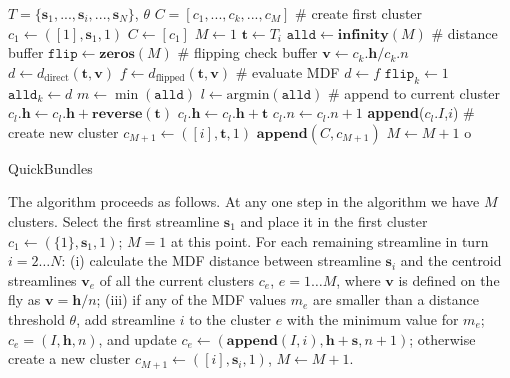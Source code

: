 \documentclass{bioinfo}
\begin{document}
\begin{methods}
\begin{algorithm}[h]
\begin{algorithmic}
\REQUIRE $T=\{\mathbf{s}_{1},...,\mathbf{s}_{i},...,\mathbf{s}_{N}\}$, $\theta$
\ENSURE $C=[c_{1},...,c_{k},...,c_{M}]$ 
\STATE \# create first cluster
\STATE $c_{1} \leftarrow ([1],\mathbf{s}_{1},1)$
\STATE $C\leftarrow[c_{1}]$
\STATE $M\leftarrow1$ 
	\STATE $\textbf{t}\leftarrow T_{i}$
	\STATE $\texttt{alld}\leftarrow\textbf{infinity}(M)$ \# distance buffer
	\STATE $\texttt{flip}\leftarrow\textbf{zeros}(M)$ \# flipping check buffer
		\STATE $\mathbf{v}\leftarrow c_{k}.\mathbf{h}/c_{k}.n$
		\STATE $d\leftarrow d_{\textrm{direct}}(\mathbf{t},\mathbf{v})$
		\STATE $f\leftarrow d_{\textrm{flipped}}(\mathbf{t},\mathbf{v})$
	\STATE \# evaluate MDF
		\STATE $d \leftarrow f$
		\STATE $\texttt{flip}_{k} \leftarrow 1$
	\ENDIF
	\STATE $\texttt{alld}_{k} \leftarrow d$
	\ENDFOR
\STATE $m\leftarrow \min(\texttt{alld})$
\STATE $l\leftarrow \mathrm{arg min}(\texttt{alld})$
\STATE \# append to current cluster
		\STATE $c_{l}.\mathbf{h} \leftarrow c_{l}.\mathbf{h} + \textbf{reverse}(\textbf{t})$
	\ELSE
		\STATE $c_{l}.\mathbf{h} \leftarrow c_{l}.\mathbf{h} + \textbf{t}$
	\ENDIF
	\STATE $c_{l}.n \leftarrow c_{l}.n + 1$
	\STATE \textbf{append}($c_{l}.I$,$i$)
\ELSE 
\STATE \# create new cluster
        \STATE $c_{M+1} \leftarrow ([i],\mathbf{t},1)$
        \STATE $\mathbf{append}(C,c_{M+1})$
	\STATE $M\leftarrow M+1$
\ENDIF
o\ENDFOR 
\end{algorithmic}
\caption{QuickBundles}
\label{Alg:QuickBundles}
\end{algorithm}

The algorithm proceeds as follows.  At any one step in the algorithm we
have $M$ clusters. Select the first streamline $\mathbf{s}_{1}$ and
place it in the first cluster $c_{1}\leftarrow(\{1\},\mathbf{s}_{1},1)$;
$M=1$ at this point.  For each remaining streamline in turn $i = 2 \dots
N$: (i) calculate the MDF distance between streamline $\mathbf{s}_{i}$
and the centroid streamlines $\mathbf{v}_{e}$ of all the current clusters
$c_{e}$, $e = 1 \dots M$, where $\mathbf{v}$ is defined on the fly as
$\mathbf{v}=\mathbf{h}/n$; (iii) if any of the MDF values $m_{e}$ are
smaller than a distance threshold $\theta$, add streamline $i$ to the
cluster $e$ with the minimum value for $m_{e}$;
$c_{e}=(I,\mathbf{h},n)$, and update
$c_{e}\leftarrow(\mathbf{append}(I,i),\mathbf{h}+\mathbf{s},n+1)$;
otherwise create a new cluster
$c_{M+1}\leftarrow([i],\mathbf{s}_{i},1)$, $M\leftarrow M+1$.


\end{methods}
\end{document}
